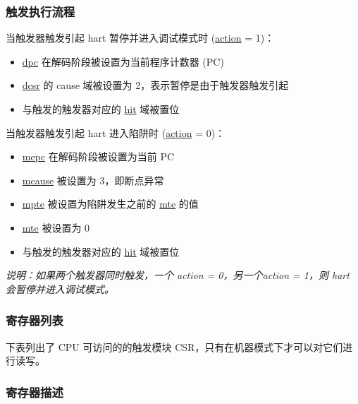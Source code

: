 \documentclass[main\_\_CN.tex]{subfiles}
\begin{document}
\subsubsection{触发执行流程}
\label{sec:riscvcpu-hwt-suggest-op}

当触发器触发引起 hart 暂停并进入调试模式时 (\hyperref[fielddesc:MCONTROLACTION]{action} = 1)：
\begin{itemize}
    \item \hyperref[regdesc:DPC]{dpc} 在解码阶段被设置为当前程序计数器 (PC)
    \item \hyperref[regdesc:DCSR]{dcsr} 的 cause 域被设置为 2，表示暂停是由于触发器触发引起
    \item 与触发的触发器对应的 \hyperref[fielddesc:MCONTROLHIT]{hit} 域被置位
\end{itemize}

当触发器触发引起 hart 进入陷阱时 (\hyperref[fielddesc:MCONTROLACTION]{action} = 0)：
\begin{itemize}
    \item \hyperref[regdesc:MEPC]{mepc} 在解码阶段被设置为当前 PC
    \item \hyperref[regdesc:MCAUSE]{mcause} 被设置为 3，即断点异常
    \item \hyperref[fielddesc:TCONTROLMPTE]{mpte} 被设置为陷阱发生之前的 \hyperref[fielddesc:TCONTROLMTE]{mte} 的值
    \item \hyperref[fielddesc:TCONTROLMTE]{mte} 被设置为 0
    \item 与触发的触发器对应的 \hyperref[fielddesc:MCONTROLHIT]{hit} 域被置位
\end{itemize}

\textit{说明：如果两个触发器同时触发，一个 action = 0，另一个action = 1，则 hart 会暂停并进入调试模式。}


\hypertarget{riscvcpu-hwt-reg-summ}{}
\subsubsection{寄存器列表}
\label{sec:riscvcpu-hwt-reg-summ}


下表列出了 CPU 可访问的的触发模块 CSR，只有在机器模式下才可以对它们进行读写。




\subsubsection{寄存器描述}
\end{document}
